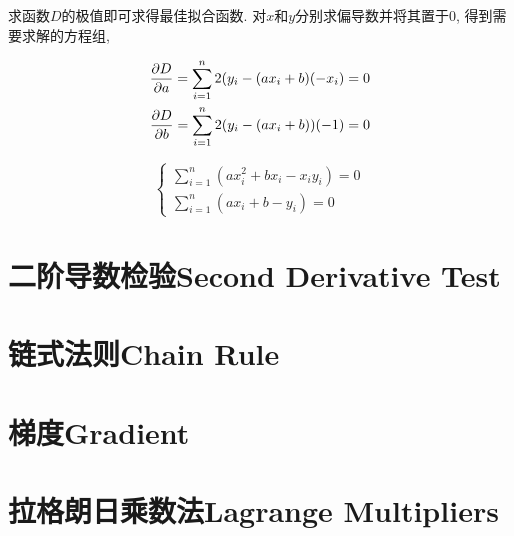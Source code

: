 求函数$ D $的极值即可求得最佳拟合函数. 对$ x $和$ y $分别求偏导数并将其置于$ 0 $, 得到需要求解的方程组,

\begin{equation}
\begin{aligned}
\frac{\partial D}{\partial a}=\sum_{i=1}^{n}2(y_i-(ax_i+b)(-x_i)=0 \\
\frac{\partial D}{\partial b}=\sum_{i=1}^{n}2(y_i-(ax_i+b))(-1)=0
\end{aligned}
\end{equation}

\begin{equation}
\begin{cases}
\sum_{i=1}^{n}(ax_i^2+bx_i-x_iy_i)=0 \\
\sum_{i=1}^{n}(ax_i+b-y_i)=0
\end{cases}
\end{equation}



\section{二阶导数检验Second Derivative Test}

\section{链式法则Chain Rule}

\section{梯度Gradient}

\section{拉格朗日乘数法Lagrange Multipliers}


